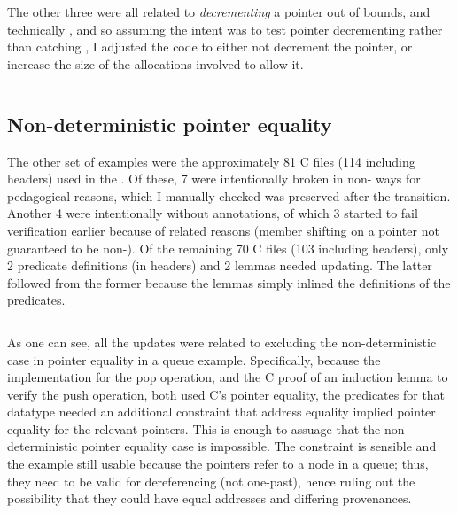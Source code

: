 The other three were all related to \emph{decrementing} a pointer out of
bounds, and technically , and so assuming the intent was to test pointer
decrementing rather than catching , I adjusted the code to either not
decrement the pointer, or increase the size of the allocations involved to allow it.

\inputminted[fontsize=\footnotesize,breaklines,firstline=69,lastline=107]{diff}{code/add_support_for_vip.patch}

\subsection{Non-deterministic pointer equality}

The other set of examples were the approximately 81 C files (114 including
headers) used in the . Of these, 7 were intentionally broken in
non- ways for pedagogical reasons, which I manually checked was
preserved after the transition. Another 4 were intentionally without
annotations, of which 3 started to fail verification earlier because of
 related reasons (member shifting on a pointer not guaranteed to be
non-). Of the remaining 70 C files (103 including headers), only
2 predicate definitions (in headers) and 2 lemmas needed updating. The latter
followed from the former because the lemmas simply inlined the definitions of
the predicates.

\inputminted[fontsize=\footnotesize,breaklines,firstline=108]{diff}{code/add_support_for_vip.patch}

As one can see, all the updates were related to excluding the non-deterministic
case in pointer equality in a queue example.
Specifically, because the implementation for the pop operation, and the C proof
of an induction lemma to verify the push operation, both used C's pointer
equality, the predicates for that datatype needed an additional constraint that
address equality implied pointer equality for the relevant pointers. This is
enough to assuage  that the non-deterministic pointer equality case
is impossible. The constraint is sensible and the example still usable because
the pointers refer to a node in a queue; thus, they need to be valid for
dereferencing (not one-past), hence ruling out the possibility that they could
have equal addresses and differing provenances.


